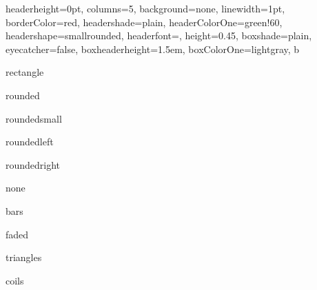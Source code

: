 \documentclass[portrait,fontscale=1,margin=0.2cm,paperwidth=15truecm, paperheight=3.5cm,debug]{baposter}
\begin{document}
\begin{poster}{
  headerheight=0pt,
  columns=5,
  background=none,
  linewidth=1pt,
  borderColor=red,
  headershade=plain,
  headerColorOne=green!60,
  headershape=smallrounded,
  headerfont={},
  height=0.45,
  boxshade=plain,
  eyecatcher=false,
  boxheaderheight=1.5em,
  boxColorOne=lightgray,
}{}{b}{}{}

\begin{posterbox}[column=0,textborder=rectangle]{}
rectangle
\end{posterbox}

\begin{posterbox}[column=1,textborder=rounded]{}
rounded
\end{posterbox}

\begin{posterbox}[column=2,textborder=roundedsmall]{}
roundedsmall
\end{posterbox}

\begin{posterbox}[column=3,textborder=roundedleft]{}
roundedleft
\end{posterbox}

\begin{posterbox}[column=4,textborder=roundedright]{}
roundedright
\end{posterbox}




\begin{posterbox}[column=0,row=0.55,textborder=none]{}
none
\end{posterbox}

\begin{posterbox}[column=1,row=0.55,textborder=bars]{}
bars
\end{posterbox}

\begin{posterbox}[column=2,row=0.55,textborder=faded]{}
faded
\end{posterbox}

\begin{posterbox}[column=3,row=0.55,textborder=triangles]{}
triangles
\end{posterbox}

\begin{posterbox}[column=4,row=0.55,linewidth=0.5pt,textborder=coils]{}
coils
\end{posterbox}

\end{poster}
\end{document}
